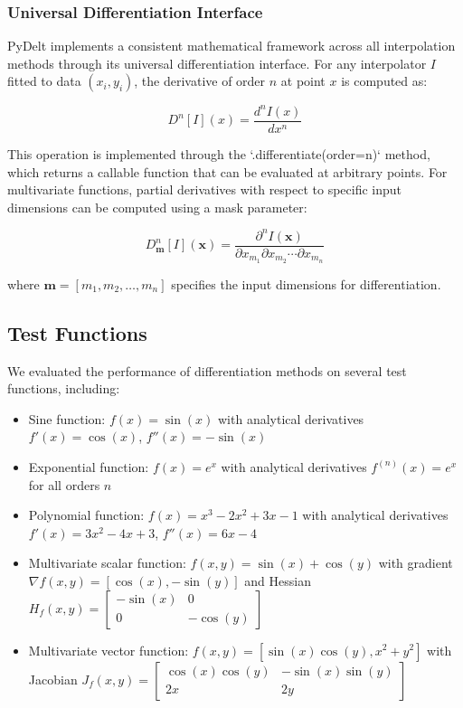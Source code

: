 \documentclass[10pt,journal,compsoc]{IEEEtran}
\begin{document}
\subsubsection{Universal Differentiation Interface}

PyDelt implements a consistent mathematical framework across all interpolation methods through its universal differentiation interface. For any interpolator $I$ fitted to data $(x_i, y_i)$, the derivative of order $n$ at point $x$ is computed as:

\begin{equation}
    D^n[I](x) = \frac{d^n I(x)}{dx^n}
\end{equation}

This operation is implemented through the `.differentiate(order=n)` method, which returns a callable function that can be evaluated at arbitrary points. For multivariate functions, partial derivatives with respect to specific input dimensions can be computed using a mask parameter:

\begin{equation}
    D^n_{\mathbf{m}}[I](\mathbf{x}) = \frac{\partial^n I(\mathbf{x})}{\partial x_{m_1} \partial x_{m_2} \cdots \partial x_{m_n}}
\end{equation}

where $\mathbf{m} = [m_1, m_2, \ldots, m_n]$ specifies the input dimensions for differentiation.

\subsection{Test Functions}

We evaluated the performance of differentiation methods on several test functions, including:
\begin{itemize}
    \item Sine function: $f(x) = \sin(x)$ with analytical derivatives $f'(x) = \cos(x)$, $f''(x) = -\sin(x)$
    
    \item Exponential function: $f(x) = e^x$ with analytical derivatives $f^{(n)}(x) = e^x$ for all orders $n$
    
    \item Polynomial function: $f(x) = x^3 - 2x^2 + 3x - 1$ with analytical derivatives $f'(x) = 3x^2 - 4x + 3$, $f''(x) = 6x - 4$
    
    \item Multivariate scalar function: $f(x,y) = \sin(x) + \cos(y)$ with gradient $\nabla f(x,y) = [\cos(x), -\sin(y)]$ and Hessian $H_f(x,y) = \begin{bmatrix} -\sin(x) & 0 \\ 0 & -\cos(y) \end{bmatrix}$
    
    \item Multivariate vector function: $f(x,y) = [\sin(x)\cos(y), x^2 + y^2]$ with Jacobian $J_f(x,y) = \begin{bmatrix} \cos(x)\cos(y) & -\sin(x)\sin(y) \\ 2x & 2y \end{bmatrix}$
\end{itemize}
\end{document}
